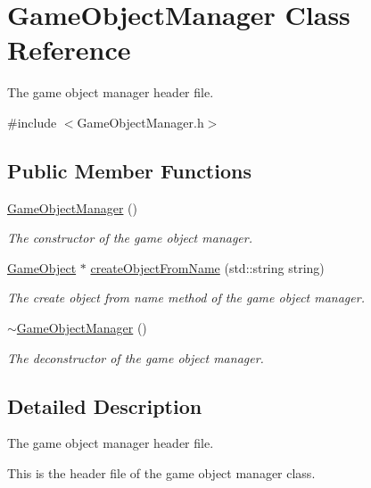 \hypertarget{class_game_object_manager}{\section{Game\+Object\+Manager Class Reference}
\label{class_game_object_manager}
}


The game object manager header file.  




{\ttfamily \#include $<$Game\+Object\+Manager.\+h$>$}

\subsection*{Public Member Functions}
\begin{DoxyCompactItemize}
\item 
\hyperlink{class_game_object_manager_a58cbaec4182cda7c6d48eef7b14885e8}{Game\+Object\+Manager} ()
\begin{DoxyCompactList}\small\item\em The constructor of the game object manager. \end{DoxyCompactList}\item 
\hyperlink{class_game_object}{Game\+Object} $\ast$ \hyperlink{class_game_object_manager_a6c36f166e3766508760a1702a064d66f}{create\+Object\+From\+Name} (std\+::string string)
\begin{DoxyCompactList}\small\item\em The create object from name method of the game object manager. \end{DoxyCompactList}\item 
\hyperlink{class_game_object_manager_a91d57baff47ce5090e5e4590f531051d}{$\sim$\+Game\+Object\+Manager} ()
\begin{DoxyCompactList}\small\item\em The deconstructor of the game object manager. \end{DoxyCompactList}\end{DoxyCompactItemize}


\subsection{Detailed Description}
The game object manager header file. 

This is the header file of the game object manager class. 


